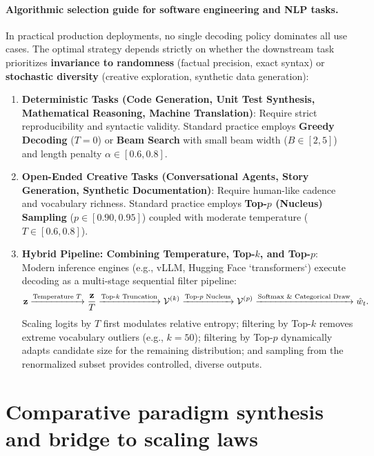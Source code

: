 \documentclass[../../main.tex]{subfiles}
\begin{document}
\paragraph{Algorithmic selection guide for software engineering and NLP tasks.}
In practical production deployments, no single decoding policy dominates all use cases. The optimal strategy depends strictly on whether the downstream task prioritizes \textbf{invariance to randomness} (factual precision, exact syntax) or \textbf{stochastic diversity} (creative exploration, synthetic data generation):
\begin{enumerate}
    \item \textbf{Deterministic Tasks (Code Generation, Unit Test Synthesis, Mathematical Reasoning, Machine Translation)}:
    Require strict reproducibility and syntactic validity. Standard practice employs \textbf{Greedy Decoding} ($T=0$) or \textbf{Beam Search} with small beam width ($B \in [2, 5]$) and length penalty $\alpha \in [0.6, 0.8]$.
    \item \textbf{Open-Ended Creative Tasks (Conversational Agents, Story Generation, Synthetic Documentation)}:
    Require human-like cadence and vocabulary richness. Standard practice employs \textbf{Top-$p$ (Nucleus) Sampling} ($p \in [0.90, 0.95]$) coupled with moderate temperature ($T \in [0.6, 0.8]$).
    \item \textbf{Hybrid Pipeline: Combining Temperature, Top-$k$, and Top-$p$}:
    Modern inference engines (e.g., vLLM, Hugging Face `transformers`) execute decoding as a multi-stage sequential filter pipeline:
    \begin{equation}
    \label{eq:decoding_pipeline_stages}
    \mathbf{z} \xrightarrow{\text{Temperature } T} \frac{\mathbf{z}}{T} \xrightarrow{\text{Top-}k \text{ Truncation}} \mathcal{V}^{(k)} \xrightarrow{\text{Top-}p \text{ Nucleus}} \mathcal{V}^{(p)} \xrightarrow{\text{Softmax \& Categorical Draw}} \hat{w}_t.
    \end{equation}
    Scaling logits by $T$ first modulates relative entropy; filtering by Top-$k$ removes extreme vocabulary outliers (e.g., $k=50$); filtering by Top-$p$ dynamically adapts candidate size for the remaining distribution; and sampling from the renormalized subset provides controlled, diverse outputs.
\end{enumerate}

\clearpage
\section{Comparative paradigm synthesis and bridge to scaling laws}
\label{sec:comparative_synthesis_scaling_bridge}
\end{document}
